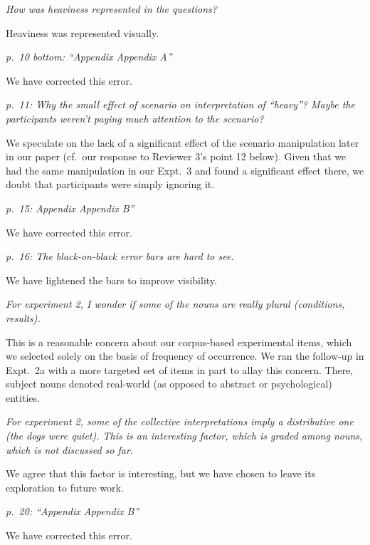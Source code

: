 \documentclass[12pt]{article}
\begin{document}
\item \emph{How was heaviness represented in the questions?}

Heaviness was represented visually.

\item \emph{p.~10 bottom: ``Appendix Appendix A''}

We have corrected this error.

\item \emph{p.~11: Why the small effect of scenario on interpretation of ``heavy''? Maybe the participants weren't paying much attention to the scenario?}

We speculate on the lack of a significant effect of the scenario manipulation later in our paper (cf.~our response to Reviewer 3's point 12 below). Given that we had the same manipulation in our Expt.~3 and found a significant effect there, we doubt that participants were simply ignoring it.

\item \emph{p.~15: Appendix Appendix B''}

We have corrected this error.

\item \emph{p.~16: The black-on-black error bars are hard to see.}

We have lightened the bars to improve visibility.

\item \emph{For experiment 2, I wonder if some of the nouns are really plural (\emph{conditions}, \emph{results}).}

This is a reasonable concern about our corpus-based experimental items, which we selected solely on the basis of frequency of occurrence. We ran the follow-up in Expt.~2a with a more targeted set of items in part to allay this concern. There, subject nouns denoted real-world (as opposed to abstract or psychological) entities.

\item \emph{For experiment 2, some of the collective interpretations imply a distributive one (\emph{the dogs were quiet}). This is an interesting factor, which is graded among nouns, which is not discussed so far.}

We agree that this factor is interesting, but we have chosen to leave its exploration to future work.

\item \emph{p.~20: ``Appendix Appendix B''}

We have corrected this error.
\end{document}
